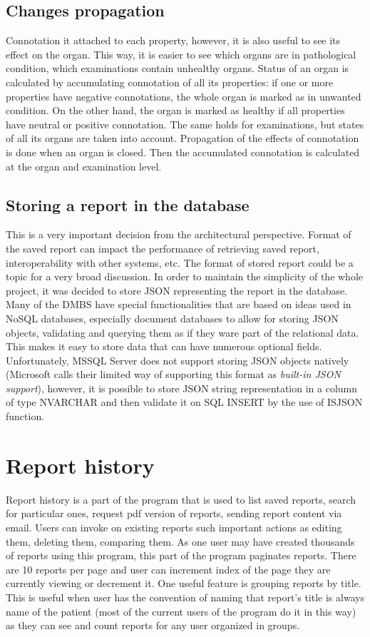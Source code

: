 \documentclass[12pt, twoside, openany]{report}
\theoremstyle{definition}
\begin{document}
\subsection{Changes propagation}\label{changes-propagation}
Connotation it attached to each property, however, it is also useful to see its effect on the organ. This way, it is easier to see which organs are in pathological condition, which examinations contain unhealthy organs. Status of an organ is calculated by accumulating connotation of all its properties: if one or more properties have negative connotations, the whole organ is marked as in unwanted condition. On the other hand, the organ is marked as healthy if all properties have neutral or positive connotation.
The same holds for examinations, but states of all its organs are taken into account. Propagation of the effects of connotation is done when an organ is closed. Then the accumulated connotation is calculated at the organ and examination level.

\subsection{Storing a report in the database}
This is a very important decision from the architectural perspective. Format of the saved report can impact the performance of retrieving saved report, interoperability with other systems, etc. The format of stored report could be a topic for a very broad discussion. In order to maintain the simplicity of the whole project, it was decided to store JSON representing the report in the database. Many of the DMBS have special functionalities that are based on ideas used in NoSQL databases, especially document databases to allow for storing JSON objects, validating and querying them as if they ware part of the relational data. This makes it easy to store data that can have numerous optional fields. Unfortunately, MSSQL Server does not support storing JSON objects natively (Microsoft calls their limited way of supporting this format as \textit{built-in JSON support}\cite{microsoft-json-support}), however, it is possible to store JSON string representation in a column of type NVARCHAR and then validate it on SQL INSERT by the use of ISJSON function.

\section{Report history}
Report history is a part of the program that is used to list saved reports, search for particular ones, request pdf version of reports, sending report content via email. Users can invoke on existing reports such important actions as editing them, deleting them, comparing them. As one user may have created thousands of reports using this program, this part of the program paginates reports. There are 10 reports per page and user can increment index of the page they are currently viewing or decrement it. 
One useful feature is grouping reports by title. This is useful when user has the convention of naming that report's title is always name of the patient (most of the current users of the program do it in this way) as they can see and count reports for any user organized in groups. 
\end{document}
